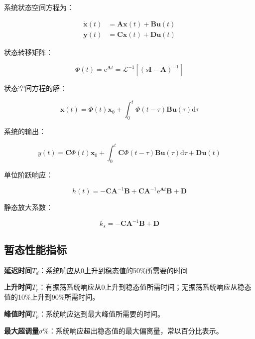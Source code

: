 \documentclass[cn, blue, normal, 12pt]{elegantnote}
\begin{document}
系统状态空间方程为：

\begin{equation}
    \begin{aligned}
        \bm{\dot{x}}(t)&=\bm{Ax}(t)+\bm{Bu}(t) \\
        \bm{y}(t)&=\bm{Cx}(t)+\bm{Du}(t)
    \end{aligned}
\end{equation}

状态转移矩阵：

\begin{equation}
    \bm{\varPhi}(t)=\text{e}^{\bm{A}t}=\mathcal{L}^{-1}\left[(s\bm{I}-\bm{A})^{-1}\right]
\end{equation}

状态空间方程的解：

\begin{equation}
    \bm{x}(t)=\bm{\varPhi}(t)\bm{x}_0+\int_{0}^{t}\bm{\varPhi}(t-\tau)\bm{Bu}(\tau)\text{d}\tau
\end{equation}

系统的输出：

\begin{equation}
    y(t)=\bm{C\varPhi}(t)\bm{x}_0+\int_{0}^{t}\bm{C\varPhi}(t-\tau)\bm{Bu}(\tau)\text{d}\tau+\bm{Du}(t)
\end{equation}

单位阶跃响应：

\begin{equation}
    h(t)=-\bm{C}\bm{A}^{-1}\bm{B}+\bm{C}\bm{A}^{-1}\text{e}^{\bm{A}t}\bm{B}+\bm{D}
\end{equation}

静态放大系数：

\begin{equation}
    k_s=-\bm{C}\bm{A}^{-1}\bm{B}+\bm{D}
\end{equation}

\subsection{暂态性能指标}

\textbf{延迟时间}$T_d$：系统响应从0上升到稳态值的50\%所需要的时间

\textbf{上升时间}$T_r$：有振荡系统响应从0上升到稳态值所需时间；无振荡系统响应从稳态值的10\%上升到90\%所需时间。

\textbf{峰值时间}$T_p$：系统响应达到最大峰值所需要的时间。

\textbf{最大超调量}$\sigma\%$：系统响应超出稳态值的最大偏离量，常以百分比表示。
\end{document}
